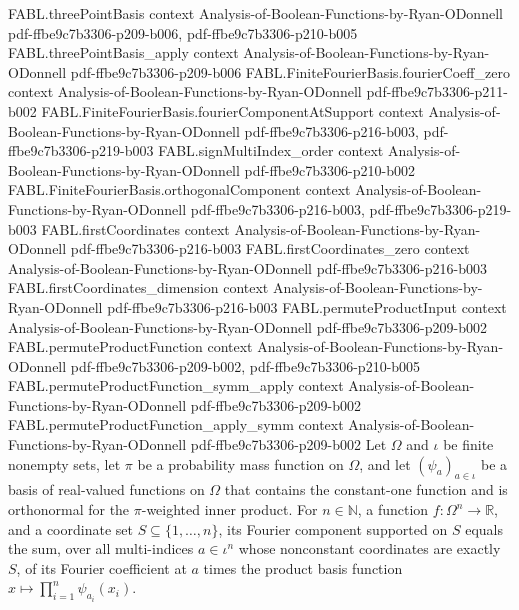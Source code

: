 \begin{theorem}
\proofstep
  {FABL.threePointBasis}
  {context}
  {Analysis-of-Boolean-Functions-by-Ryan-ODonnell}
  {pdf-ffbe9c7b3306-p209-b006,
    pdf-ffbe9c7b3306-p210-b005}
\proofstep
  {FABL.threePointBasis_apply}
  {context}
  {Analysis-of-Boolean-Functions-by-Ryan-ODonnell}
  {pdf-ffbe9c7b3306-p209-b006}
\proofstep
  {FABL.FiniteFourierBasis.fourierCoeff_zero}
  {context}
  {Analysis-of-Boolean-Functions-by-Ryan-ODonnell}
  {pdf-ffbe9c7b3306-p211-b002}
\proofstep
  {FABL.FiniteFourierBasis.fourierComponentAtSupport}
  {context}
  {Analysis-of-Boolean-Functions-by-Ryan-ODonnell}
  {pdf-ffbe9c7b3306-p216-b003,
    pdf-ffbe9c7b3306-p219-b003}
\proofstep
  {FABL.signMultiIndex_order}
  {context}
  {Analysis-of-Boolean-Functions-by-Ryan-ODonnell}
  {pdf-ffbe9c7b3306-p210-b002}
\proofstep
  {FABL.FiniteFourierBasis.orthogonalComponent}
  {context}
  {Analysis-of-Boolean-Functions-by-Ryan-ODonnell}
  {pdf-ffbe9c7b3306-p216-b003,
    pdf-ffbe9c7b3306-p219-b003}
\proofstep
  {FABL.firstCoordinates}
  {context}
  {Analysis-of-Boolean-Functions-by-Ryan-ODonnell}
  {pdf-ffbe9c7b3306-p216-b003}
\proofstep
  {FABL.firstCoordinates_zero}
  {context}
  {Analysis-of-Boolean-Functions-by-Ryan-ODonnell}
  {pdf-ffbe9c7b3306-p216-b003}
\proofstep
  {FABL.firstCoordinates_dimension}
  {context}
  {Analysis-of-Boolean-Functions-by-Ryan-ODonnell}
  {pdf-ffbe9c7b3306-p216-b003}
\proofstep
  {FABL.permuteProductInput}
  {context}
  {Analysis-of-Boolean-Functions-by-Ryan-ODonnell}
  {pdf-ffbe9c7b3306-p209-b002}
\proofstep
  {FABL.permuteProductFunction}
  {context}
  {Analysis-of-Boolean-Functions-by-Ryan-ODonnell}
  {pdf-ffbe9c7b3306-p209-b002,
    pdf-ffbe9c7b3306-p210-b005}
\proofstep
  {FABL.permuteProductFunction_symm_apply}
  {context}
  {Analysis-of-Boolean-Functions-by-Ryan-ODonnell}
  {pdf-ffbe9c7b3306-p209-b002}
\proofstep
  {FABL.permuteProductFunction_apply_symm}
  {context}
  {Analysis-of-Boolean-Functions-by-Ryan-ODonnell}
  {pdf-ffbe9c7b3306-p209-b002}
Let $\Omega$ and $\iota$ be finite nonempty sets, let $\pi$ be a probability mass
function on $\Omega$, and let $(\psi_a)_{a\in\iota}$ be a basis of real-valued functions
on $\Omega$ that contains the constant-one function and is orthonormal for the
$\pi$-weighted inner product. For $n\in\mathbb N$, a function $f:\Omega^n\to\mathbb R$,
and a coordinate set $S\subseteq\{1,\ldots,n\}$, its Fourier component supported on $S$
equals the sum, over all multi-indices $a\in\iota^n$ whose nonconstant coordinates are
exactly $S$, of its Fourier coefficient at $a$ times the product basis function
$x\mapsto\prod_{i=1}^n\psi_{a_i}(x_i)$.
\end{theorem}

